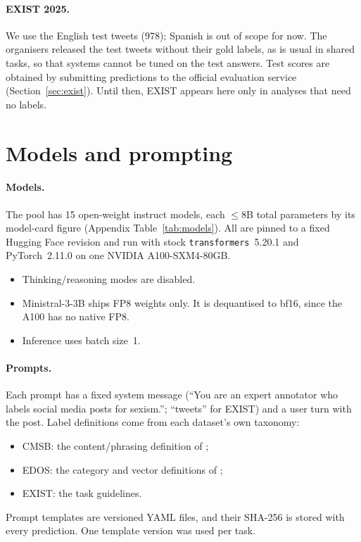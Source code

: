 \documentclass[11pt]{article}
\begin{document}
\paragraph{EXIST 2025.} We use the English test tweets (978); Spanish is out of scope for now. The organisers released the test tweets without their gold labels, as is usual in shared tasks, so that systems cannot be tuned on the test answers. Test scores are obtained by submitting predictions to the official evaluation service (Section~\ref{sec:exist}). Until then, EXIST appears here only in analyses that need no labels.

\section{Models and prompting}\label{sec:models}
\paragraph{Models.} The pool has 15 open-weight instruct models, each $\leq$8B total parameters by its model-card figure (Appendix Table~\ref{tab:models}). All are pinned to a fixed Hugging Face revision and run with stock \texttt{transformers}~5.20.1 and PyTorch~2.11.0 on one NVIDIA A100-SXM4-80GB.
\begin{itemize}
  \item Thinking/reasoning modes are disabled.
  \item Ministral-3-3B ships FP8 weights only. It is dequantised to bf16, since the A100 has no native FP8.
  \item Inference uses batch size~1.
\end{itemize}

\paragraph{Prompts.} Each prompt has a fixed system message (``You are an expert annotator who labels social media posts for sexism.''; ``tweets'' for EXIST) and a user turn with the post. Label definitions come from each dataset's own taxonomy:
\begin{itemize}
  \item CMSB: the content/phrasing definition of \citet{samory2021callme};
  \item EDOS: the category and vector definitions of \citet{kirk2023semeval};
  \item EXIST: the task guidelines.
\end{itemize}
Prompt templates are versioned YAML files, and their SHA-256 is stored with every prediction. One template version was used per task.
\end{document}
